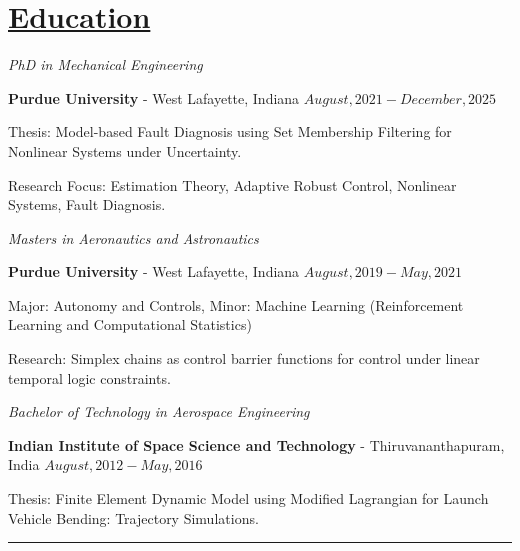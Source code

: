 \section*{\underline{Education}}

\noindent \textit{PhD in Mechanical Engineering}

\textbf{Purdue University} - West Lafayette, Indiana \hfill $August, 2021 - December, 2025$

Thesis: Model-based Fault Diagnosis using Set Membership Filtering for Nonlinear Systems under Uncertainty.

Research Focus: Estimation Theory, Adaptive Robust Control, Nonlinear Systems, Fault Diagnosis.

\medskip

\noindent \textit{Masters in Aeronautics and Astronautics}

\textbf{Purdue University} - West Lafayette, Indiana \hfill $August, 2019 - May, 2021$

Major: Autonomy and Controls, Minor: Machine Learning (Reinforcement Learning and Computational Statistics)

Research: Simplex chains as control barrier functions for control under linear temporal logic constraints.

\medskip

\noindent \textit{Bachelor of Technology in Aerospace Engineering }

\textbf{Indian Institute of Space Science and Technology} - Thiruvananthapuram, India \hfill $ August, 2012 - May, 2016 $

Thesis: Finite Element Dynamic Model using Modified Lagrangian for Launch Vehicle Bending: Trajectory Simulations.

\noindent\rule{\textwidth}{0.4pt}

